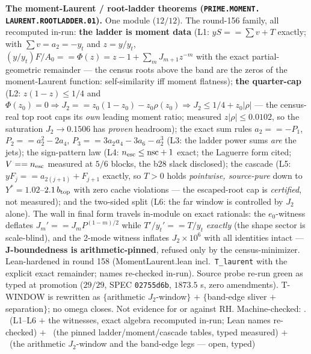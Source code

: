 \par\smallskip\noindent\textbf{The moment-Laurent / root-ladder
theorems (\texttt{PRIME.\allowbreak MOMENT.\allowbreak
LAURENT.\allowbreak ROOTLADDER.01}).}
One module ($12/12$).  The round-156 family, all recomputed
in-run: \textbf{the ladder is moment data} (L1: $y S == \sum v +
T$ exactly; with $\sum v = a_2 = -y_t$ and $z = y/y_t$,
$(y/y_t)F/A_0 == \Phi(z) = z - 1 + \sum_m J_{m+1} z^{-m}$ with
the exact partial-geometric remainder --- the census roots above
the band are the zeros of the moment-Laurent function:
self-similarity iff moment flatness); \textbf{the quarter-cap}
(L2: $z(1-z) \le 1/4$ and $\Phi(z_0) = 0 \Rightarrow J_2 ==
z_0(1 - z_0) - z_0\rho(z_0) \Rightarrow J_2 \le 1/4 +
z_0|\rho|$ --- the census-real top root caps its \emph{own}
leading moment ratio; measured $z|\rho| \le 0.0102$, so the
saturation $J_2 \to 0.1506$ has \emph{proven} headroom); the
exact sum rules $a_2 == -P_1$, $P_2 == a_2^2 - 2a_4$, $P_3 ==
3a_2a_4 - 3a_6 - a_2^3$ (L3: the ladder power sums \emph{are}
the jets); the sign-pattern law (L4: $n_{\rm esc} \le
\mathrm{nsc} + 1$ exact; the Laguerre form cited; $V == n_{\rm
esc}$ measured at $5/6$ blocks, the b28 slack disclosed); the
cascade (L5: $y F_j == a_{2(j+1)} + F_{j+1}$ exactly, so $T > 0$
holds \emph{pointwise, source-pure} down to $Y^* =
1.02$--$2.1\,b_{\rm top}$ with zero cache violations --- the
escaped-root cap is \emph{certified}, not measured); and the
two-sided split (L6: the far window is controlled by $J_2$
alone).  The wall in final form travels in-module on exact
rationals: the $e_0$-witness deflates $J_m' == J_m
P^{(1-m)/2}$ while $T'/y_t' == T/y_t$ \emph{exactly} (the shape
sector is scale-blind), and the 2-mode witness inflates $J_2
\times 10^6$ with all identities intact ---
\textbf{J-boundedness is arithmetic-pinned}, refused only by the
census-minimizer.  Lean-hardened in round 158
(MomentLaurent.lean incl.\ \texttt{T\_laurent} with the explicit
exact remainder; names re-checked in-run).  Source probe re-run
green as typed at promotion ($29/29$, SPEC \texttt{02755d6b},
$1873.5$ s, zero amendments).  T-WINDOW is rewritten as
$\{$arithmetic $J_2$-window$\}$ $+$ $\{$band-edge sliver $+$
separation$\}$; no omega closes.  Not evidence for or against
RH.
Machine-checked: .
\mE\ (L1--L6 $+$ the witnesses, exact algebra recomputed in-run;
Lean names re-checked) $+$ \mC\ (the pinned ladder/moment/cascade
tables, typed measured) $+$ \mO\ (the arithmetic $J_2$-window
and the band-edge legs --- open, typed)
\par\smallskip


